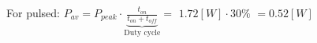 \documentclass[preview]{standalone}
\begin{document}
\begin{center}
For pulsed: $P_{av} = P_{peak} \cdot $$\underbrace{\frac{t_{on}}{t_{on}+t_{off}}}_{\text{Duty cycle}}=$ $1.72 [W] \cdot $$30 \%$ $=$$0.52 [W]$
\end{center}
\end{document}
